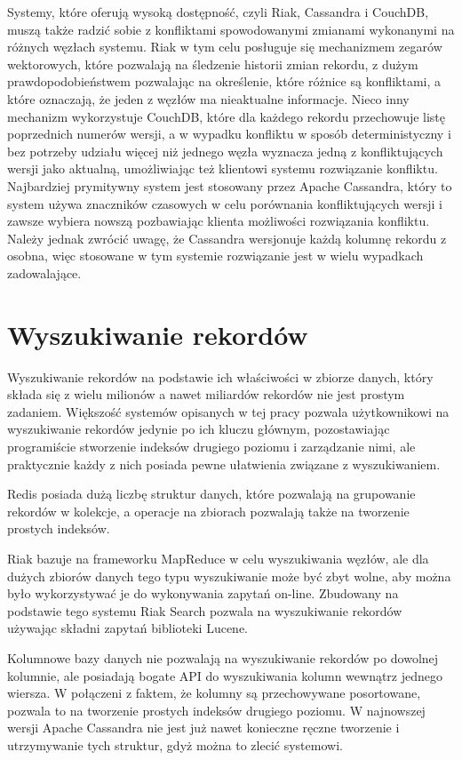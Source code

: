 Systemy, które oferują wysoką dostępność, czyli Riak, Cassandra i CouchDB, muszą także radzić sobie z konfliktami spowodowanymi zmianami wykonanymi na różnych węzłach systemu.
Riak w tym celu posługuje się mechanizmem zegarów wektorowych, które pozwalają na śledzenie historii zmian rekordu, z dużym prawdopodobieństwem pozwalając na określenie, które różnice są konfliktami, a które oznaczają, że jeden z węzłów ma nieaktualne informacje.
Nieco inny mechanizm wykorzystuje CouchDB, które dla każdego rekordu przechowuje listę poprzednich numerów wersji, a w wypadku konfliktu w sposób deterministyczny i bez potrzeby udziału więcej niż jednego węzła wyznacza jedną z konfliktujących wersji jako aktualną, umożliwiając też klientowi systemu rozwiązanie konfliktu.
Najbardziej prymitywny system jest stosowany przez Apache Cassandra, który to system używa znaczników czasowych w celu porównania konfliktujących wersji i zawsze wybiera nowszą pozbawiając klienta możliwości rozwiązania konfliktu.
Należy jednak zwrócić uwagę, że Cassandra wersjonuje każdą kolumnę rekordu z osobna, więc stosowane w tym systemie rozwiązanie jest w wielu wypadkach zadowalające.

\section{Wyszukiwanie rekordów}

Wyszukiwanie rekordów na podstawie ich właściwości w zbiorze danych, który składa się z wielu milionów a nawet miliardów rekordów nie jest prostym zadaniem.
Większość systemów opisanych w tej pracy pozwala użytkownikowi na wyszukiwanie rekordów jedynie po ich kluczu głównym, pozostawiając programiście stworzenie indeksów drugiego poziomu i zarządzanie nimi, ale praktycznie każdy z nich posiada pewne ułatwienia związane z wyszukiwaniem.

Redis posiada dużą liczbę struktur danych, które pozwalają na grupowanie rekordów w kolekcje, a operacje na zbiorach pozwalają także na tworzenie prostych indeksów.

Riak bazuje na frameworku MapReduce w celu wyszukiwania węzłów, ale dla dużych zbiorów danych tego typu wyszukiwanie może być zbyt wolne, aby można było wykorzystywać je do wykonywania zapytań on-line.
Zbudowany na podstawie tego systemu Riak Search pozwala na wyszukiwanie rekordów używając składni zapytań biblioteki Lucene.

Kolumnowe bazy danych nie pozwalają na wyszukiwanie rekordów po dowolnej kolumnie, ale posiadają bogate API do wyszukiwania kolumn wewnątrz jednego wiersza.
W połączeni z faktem, że kolumny są przechowywane posortowane, pozwala to na tworzenie prostych indeksów drugiego poziomu.
W najnowszej wersji Apache Cassandra nie jest już nawet konieczne ręczne tworzenie i utrzymywanie tych struktur, gdyż można to zlecić systemowi.

